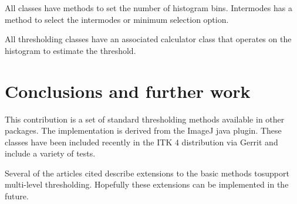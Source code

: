 \documentclass{InsightArticle}
\begin{document}
All classes have methods to set the number of histogram
bins. Intermodes has a method to select the intermodes or minimum
selection option.

All thresholding classes have an associated calculator class that
operates on the histogram to estimate the threshold.

\section{Conclusions and further work}
This contribution is a set of standard thresholding methods available
in other packages. The implementation is derived from the ImageJ
java plugin. These classes have been included recently in the ITK 4
distribution via Gerrit and include a variety of tests.

Several of the articles cited describe extensions to the basic methods
tosupport multi-level thresholding. Hopefully these extensions can be
implemented in the future.

\appendix





\nocite{ITKSoftwareGuide}
\end{document}
